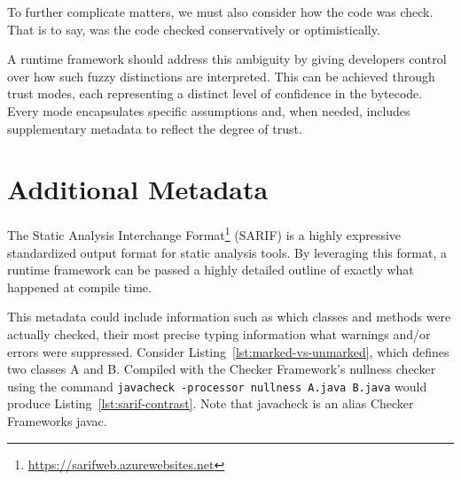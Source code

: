 \documentclass[12pt]{article}
\begin{document}
To further complicate matters, we must also consider how the code was check. That is to say, was the code checked conservatively or optimistically.

A runtime framework should address this ambiguity by giving developers control over how such fuzzy distinctions are interpreted. This can be achieved through trust modes, each representing a distinct level of confidence in the bytecode. Every mode encapsulates specific assumptions and, when needed, includes supplementary metadata to reflect the degree of trust. 

\section{Additional Metadata}\label{sec:metadata}
The Static Analysis Interchange Format\footnote{\url{https://sarifweb.azurewebsites.net}} (SARIF) is a highly expressive standardized output format for static analysis tools. By leveraging this format, a runtime framework can be passed a highly detailed outline of exactly what happened at compile time.

This metadata could include information such as which classes and methods were actually checked, their most precise typing information what warnings and/or errors were suppressed. Consider Listing~\ref{lst:marked-vs-unmarked}, which defines two classes A and B. Compiled with the Checker Framework's nullness checker using the command \lstinline!javacheck -processor nullness A.java B.java! would produce  Listing~\ref{lst:sarif-contrast}. Note that javacheck is an alias Checker Frameworks javac. 
\end{document}
